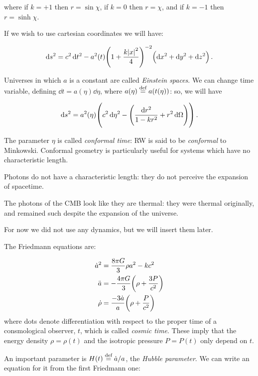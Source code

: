 \documentclass[main.tex]{subfiles}
\begin{document}
where if \(k = +1\)  then \(r = \sin \chi\), if \(k=0\)  then \(r=\chi\), and if \(k = -1\) then \(r = \sinh \chi\).

If we wish to use cartesian coordinates we will have:

\begin{equation}
  \dd{s^2} = c^2 \dd{t^2} - a^2 (t) \qty(1 + \frac{k \abs{x}^2}{4} )^{-2} \qty(\dd{x^2} + \dd{y^2} + \dd{z^2}) \,.
\end{equation}

Universes in which \(a\) is a constant are called \emph{Einstein spaces}.
We can change time variable, defining \(\dd{t} = a(\eta) \dd{\eta} \), where \(a(\eta) \stackrel{\text{def}}{=} a(t(\eta))\):  so, we will have

\begin{equation}
  \dd{s^2} = a^2 (\eta) \qty(c^2 \dd{\eta^2} - \qty(\frac{\dd{r^2}}{1 - kr^2} + r^2 \dd{\Omega})) \,.
\end{equation}

The parameter \(\eta\) is called \emph{conformal time}: RW is said to be \emph{conformal} to Minkowski.
Conformal geometry is particularly useful for systems which have no characteristic length.

Photons do not have a characteristic length: they do not perceive the expansion of spacetime.

The photons of the CMB look like they are thermal: they were thermal originally, and remained such despite the expansion of the universe.

For now we did not use any dynamics, but we will insert them later.

The Friedmann equations are:

\begin{subequations}
\begin{align}
    \dot{a}^2 &= \frac{8 \pi G }{3} \rho a^2 - kc^2  \\
    \ddot{a} &= - \frac{4 \pi G }{3}  \qty(\rho  + \frac{3P}{c^2} )  \\
    \dot{\rho} &= \frac{-3 \dot{a} }{a} \qty(\rho + \frac{P}{c^2} )
\end{align}
\end{subequations}
%
where dots denote differentiation with respect to the proper time of a consmological observer, \(t\), which is called \emph{cosmic time}.
These imply that the energy density \(\rho = \rho( t)\) and the isotropic pressure \(P = P(t)\) only depend on \(t\).

An important parameter is \(H(t) \stackrel{\text{def}}{=} \dot{a} / a\), the \emph{Hubble parameter}.
We can write an equation for it from the first Friedmann one:
\end{document}
